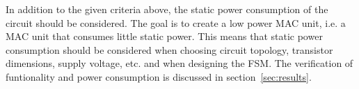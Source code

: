 In addition to the given criteria above, the static power consumption of the circuit should be considered. The goal is
to create a low power MAC unit, i.e. a MAC unit that consumes little static power. This means that
static power consumption should be considered when choosing circuit topology, transistor dimensions, supply voltage, etc. and when designing the FSM. The verification of funtionality and power consumption is discussed in section~\ref{sec:results}.